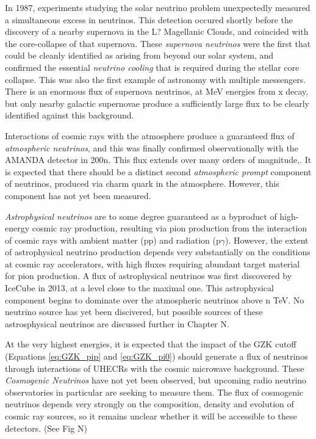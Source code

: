 In 1987, experiments studying the solar neutrino problem unexpectedly measured a simultaneous excess in neutrinos. This detection occured shortly before the discovery of a nearby supernova in the L? Magellanic Clouds, and coincided with the core-collapse of that supernova. These \emph{supernova neutrinos} were the first that could be cleanly identified as arising from beyond our solar system, and confirmed the essential \emph{neutrino cooling} that is required during the stellar core collapse. This was also the first example of astronomy with multiple messengers. There is an enormous flux of supernova neutrinos, at MeV energies from x decay, but only nearby galactic supernovae produce a sufficiently large flux to be clearly identified against this background.

Interactions of cosmic rays with the atmosphere produce a guaranteed flux of \emph{atmospheric neutrinos}, and this was finally confirmed observationally with the AMANDA detector in 200n. This flux extends over many orders of magnitude,. It is expected that there should be a distinct second \emph{atmospheric prompt} component of neutrinos, produced via charm quark in the atmosphere. However, this component has not yet been measured.

\emph{Astrophysical neutrinos} are to some degree guaranteed as a byproduct of high-energy cosmic ray production, resulting via pion production from the interaction of cosmic rays with ambient matter (pp) and radiation (p$\gamma$). However, the extent of astrophysical neutrino production depends very substantially on the conditions at cosmic ray accelerators, with high fluxes requiring abundant target material for pion production. A flux of astrophysical neutrinos was first discovered by IceCube in 2013, at a level close to the maximal one. This astrophysical component begins to dominate over the atmospheric neutrinos above n TeV. No neutrino source has yet been discivered, but possible sources of these astrosphysical neutrinos are discussed further in Chapter N.

At the very highest energies, it is expected that the impact of the GZK cutoff (Equations \ref{eq:GZK_pip} and \ref{eq:GZK_pi0}) should generate a flux of neutrinos through interactions of UHECRs with the cosmic microwave background. These \emph{Cosmogenic Neutrinos} have not yet been observed, but upcoming radio neutrino observatories in particular are seeking to measure them. The flux of cosmogenic neutrinos depends very strongly on the composition, density and evolution of cosmic ray sources, so it remains unclear whether it will be accessible to these detectors. (See Fig N)

